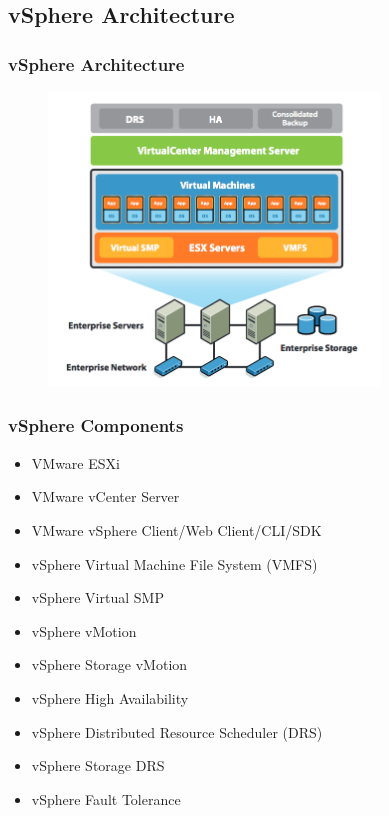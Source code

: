 \documentclass[CJK]{beamer}
\begin{document}
\subsection{vSphere Architecture}
\begin{frame}[t]
    \frametitle{vSphere Architecture}
    \begin{figure}[b]
        \includegraphics[width=250pt]{"vsphere_architecture.png"}
    \end{figure}
\end{frame}

\begin{frame}[t]
    \frametitle{vSphere Components}
        \begin{itemize}
            \item VMware ESXi
            \item VMware vCenter Server
            \item VMware vSphere Client/Web Client/CLI/SDK
            \item vSphere Virtual Machine File System (VMFS)
            \item vSphere Virtual SMP
            \item vSphere vMotion
            \item vSphere Storage vMotion
            \item vSphere High Availability
            \item vSphere Distributed Resource Scheduler (DRS)
            \item vSphere Storage DRS
            \item vSphere Fault Tolerance
        \end{itemize}
\end{frame}
\end{document}
